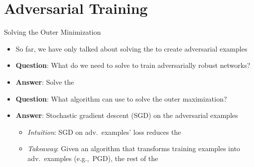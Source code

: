 \section{Adversarial Training}


\begin{frame}{Solving the Outer Minimization}

  \begin{itemize}[<+->]
    \item So far, we have only talked about solving the  to create adversarial examples

    \vspace{13pt}
    \item \textbf{Question}: What do we need to solve to train adversarially robust networks?
    \vspace{5pt}
    \item \textbf{Answer}: Solve the 

    \vspace{13pt}
    \item \textbf{Question}: What algorithm can use to solve the outer maximization?
    \vspace{5pt}
    \item \textbf{Answer}: Stochastic gradient descent (SGD) on the adversarial examples
      \begin{itemize}[<+->]
        \setlength{\itemsep}{6pt}
        \item \textit{Intuition}: SGD on adv.\ examples' loss reduces the 
        \item \textit{Takeaway}: Given an algorithm that transforms training examples into adv.\ examples (e.g.,~PGD), the rest of the \textbf{}
      \end{itemize}
  \end{itemize}
\end{frame}



